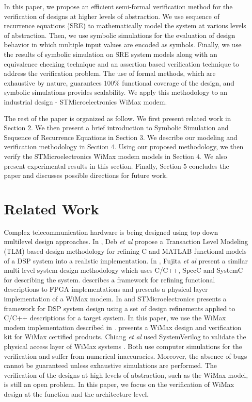 \documentclass[submission,copyright,creativecommons]{eptcs}
\begin{document}
In this paper, we propose an efficient semi-formal verification method for the verification of designs at higher levels of abstraction. We use sequence of recurrence equations (SRE) \cite{1} to mathematically model the system at various levels of abstraction. Then, we use symbolic simulations for the evaluation of design behavior in which multiple input values are encoded as symbols. Finally, we use the results of symbolic simulation on SRE system models along with an equivalence checking technique and an assertion based verification technique to address the verification problem. The use of formal methods, which are exhaustive by nature, guarantees 100\% functional coverage of the design, and symbolic simulations provides scalability. We apply this methodology to an industrial design - STMicroelectronics WiMax modem.

The rest of the paper is organized as follow. We first present related work in Section 2. We then present a brief introduction to Symbolic Simulation and Sequence of Recurrence Equations in Section 3. We describe our modeling and verification methodology in Section 4. Using our proposed methodology, we then verify the STMicroelectronics WiMax modem models in Section 4. We also present experimental results in this section. Finally, Section 5 concludes the paper and discusses possible directions for future work.

\section{Related Work}
Complex telecommunication hardware is being designed using top down multilevel design approaches. In \cite{23}, Deb \emph{et al} propose a Transaction Level Modeling (TLM) based design methodology for refining C and MATLAB functional models of a DSP system into a realistic implementation. In \cite{8}, Fujita \emph{et al} present a similar multi-level system design methodology which uses C/C++, SpecC \cite{72} and SystemC \cite{66} for describing the system. \cite{56} describes a framework for refining functional descriptions to FPGA implementations and presents a physical layer implementation of a WiMax modem. In \cite{38} and \cite{39} STMicroelectronics presents a framework for DSP system design using a set of design refinements applied to C/C++ descriptions for a target system. In this paper, we use the WiMax modem implementation described in \cite{38,39}. \cite{60} presents a WiMax design and verification kit for WiMax certified products. Chiang \emph{et al} used SystemVerilog to validate the physical access layer of WiMax systems \cite{59}. Both \cite{59,60} use computer simulations for the verification and suffer from numerical inaccuracies. Moreover, the absence of bugs cannot be guaranteed unless exhaustive simulations are performed. The verification of the designs at high levels of abstraction, such as the WiMax model, is still an open problem. In this paper, we focus on the verification of WiMax design at the function and the architecture level.
\end{document}
